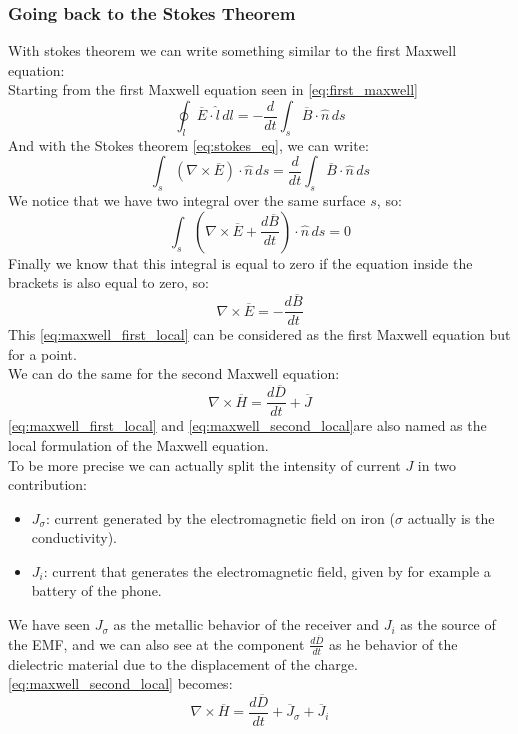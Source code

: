 \subsubsection*{Going back to the Stokes Theorem}
With stokes theorem we can write something similar to the first Maxwell equation:\\
Starting from the first Maxwell equation seen in \cref{eq:first_maxwell}
\begin{equation}
\oint_l \overline{E} \cdot \hat{l} \, dl = -\frac{d}{dt}\int_s \overline{B} \cdot \hat{n} \, ds
\end{equation} 
And with the Stokes theorem \cref{eq:stokes_eq}, we can write:
\begin{equation}
\int_s (\nabla \times \overline{E})\cdot \hat{n}\,ds=\frac{d}{dt}\int_s \overline{B}\cdot\hat{n}\, ds
\end{equation}
We notice that we have two integral over the same surface $s$, so:
\begin{equation}
\int_s \left(\nabla\times\overline{E}+\frac{d\overline{B}}{dt}\right)\cdot\hat{n}\,ds=0
\end{equation}
Finally we know that this integral is equal to zero if the equation inside the brackets is also equal to zero, so:
\begin{equation}\label{eq:maxwell_first_local}
\nabla\times\overline{E}=-\frac{d\overline{B}}{dt}
\end{equation}
This \cref{eq:maxwell_first_local} can be considered as the first Maxwell equation but for a point.\\
We can do the same for the second Maxwell equation:
\begin{equation}\label{eq:maxwell_second_local}
\nabla\times\overline{H}=\frac{d\overline{D}}{dt}+\overline{J}
\end{equation}
\cref{eq:maxwell_first_local} and \cref{eq:maxwell_second_local}are also named as the local formulation of the Maxwell equation.\\
To be more precise we can actually split the intensity of current $J$ in two contribution:
\begin{itemize}
\item $J_\sigma$: current generated by the electromagnetic field on iron ($\sigma$ actually is the conductivity).
\item $J_i$: current that generates the electromagnetic field, given by for example a battery of the phone.
\end{itemize}
We have seen $J_\sigma$ as the metallic behavior of the receiver and $J_i$ as the source of the EMF, and we can also see at the component $\frac{d\overline{D}}{dt}$ as he behavior of the dielectric material due to the displacement of the charge.\\
\cref{eq:maxwell_second_local} becomes:
\begin{equation}
\nabla\times\overline{H}=\frac{d\overline{D}}{dt}+\overline{J}_\sigma+\overline{J}_i
\end{equation}
